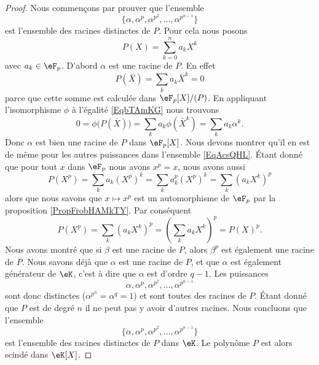 \begin{proof}
    Nous commençons par prouver que l'ensemble
    \begin{equation}        \label{EqAcsQHL}
        \{ \alpha,\alpha^p,\alpha^{p^2},\ldots, \alpha^{p^{n-1}} \}
    \end{equation}
    est l'ensemble des racines distinctes de \( P\). Pour cela nous posons
    \begin{equation}
        P(X)=\sum_{k=0}^na_kX^k
    \end{equation}
    avec \( a_k\in\eF_p\). D'abord \( \alpha\) est une racine de \( P\). En effet
    \begin{equation}        \label{EqbTAmKG}
        P(\bar X)=\sum_ka_k\bar X^k=0
    \end{equation}
    parce que cette somme est calculée dans \( \eF_p[X]/(P)\). En appliquant l'isomorphisme \( \phi\) à l'égalité \eqref{EqbTAmKG} nous trouvons
    \begin{equation}
        0=\phi\big( P(\bar X) \big)=\sum_ka_k\phi(\bar X^k)=\sum_ka_k\alpha^k.
    \end{equation}
    Donc \( \alpha\) est bien une racine de \( P\) dans \( \eF_p[X]\). Nous devons montrer qu'il en est de même pour les autres puissances dans l'ensemble \eqref{EqAcsQHL}. Étant donné que pour tout \( x\) dans \( \eF_p\) nous avons \( x^p=x\), nous avons aussi
    \begin{equation}
        P(X^p)=\sum_ka_k(X^p)^k=\sum_ka_k^p(X^p)^k=\sum_k(a_kX^k)^p
    \end{equation}
    alors que nous savons que \( x\mapsto x^p\) est un automorphisme de \( \eF_p\) par la proposition \ref{PropFrobHAMkTY}. Par conséquent
    \begin{equation}
        P(X^p)=\sum_k(a_kX^k)^p=\left( \sum_k a_kX^k\right)^p=P(X)^p.
    \end{equation}
    Nous avons montré que si \( \beta\) est une racine de \( P\), alors \( \beta^p\) est également une racine de \( P\). Nous savons déjà que \( \alpha\) est une racine de \( P\), et que \( \alpha\) est également générateur de \( \eK\), c'est à dire que \( \alpha\) est d'ordre \( q-1\). Les puissances
    \begin{equation}
        \alpha,\alpha^p,\alpha^{p^2},\ldots, \alpha^{p^{n-1}}
    \end{equation}
    sont donc distinctes (\( \alpha^{p^n}=\alpha^q=1\)) et sont toutes des racines de \( P\). Étant donné que \( P\) est de degré \( n\) il ne peut pas y avoir d'autres racines. Nous concluons que l'ensemble
    \begin{equation}
        \{ \alpha,\alpha^p,\alpha^{p^2},\ldots, \alpha^{p^{n-1}}\}
    \end{equation}
    est l'ensemble des racines distinctes de \( P\) dans \( \eK\). Le polynôme \( P\) est alors scindé dans \( \eK[X]\).


\end{proof}
